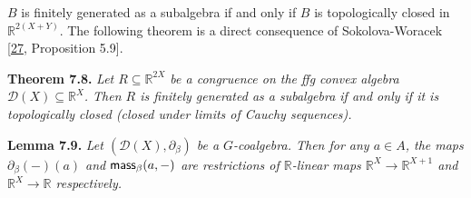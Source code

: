 \hypertarget{html:S7.SS0.SSS0.P0.SPx4.p2.m10}{}\({B}\) is finitely generated as a subalgebra if and only if %
\hypertarget{html:S7.SS0.SSS0.P0.SPx4.p2.m11}{}\({B}\) is topologically closed in %
\hypertarget{html:S7.SS0.SSS0.P0.SPx4.p2.m12}{}\({\mathbb{R}^{2(X+Y)}}\). The following theorem is a direct consequence of Sokolova-Woracek [\hyperlink{html:bib.bib27}{27}, Proposition 5.9].
\par\medskip
\hypertarget{html:S7.Thmtheorem8}{} \par\noindent\textbf{\textbf{Theorem 7.8}\textbf{.}}\quad  %
\hypertarget{html:S7.Thmtheorem8.p1}{} \emph{Let %
\hypertarget{html:S7.Thmtheorem8.p1.m1}{}\({R\subseteq\mathbb{R}^{2X}}\) be a congruence on the ffg convex algebra %
\hypertarget{html:S7.Thmtheorem8.p1.m2}{}\({{\mathcal{D}}(X)\subseteq\mathbb{R}^{X}}\). Then %
\hypertarget{html:S7.Thmtheorem8.p1.m3}{}\({R}\) is finitely generated as a subalgebra if and only if it is topologically closed (closed under limits of Cauchy sequences).}
\par\medskip
\hypertarget{html:S7.Thmtheorem9}{} \par\noindent\textbf{\textbf{Lemma 7.9}\textbf{.}}\quad  %
\hypertarget{html:S7.Thmtheorem9.p1}{} \emph{Let %
\hypertarget{html:S7.Thmtheorem9.p1.m1}{}\({({\mathcal{D}}(X),\partial_{\beta})}\) be a %
\hypertarget{html:S7.Thmtheorem9.p1.m2}{}\({G}\)-coalgebra. Then for any %
\hypertarget{html:S7.Thmtheorem9.p1.m3}{}\({a\in A}\), the maps %
\hypertarget{html:S7.Thmtheorem9.p1.m4}{}\({\partial_{\beta}(-)(a)}\) and %
\hypertarget{html:S7.Thmtheorem9.p1.m5}{}\({\mbox{\sf mass}_{\beta}(a,-)}\) are restrictions of %
\hypertarget{html:S7.Thmtheorem9.p1.m6}{}\({\mathbb{R}}\)-linear maps %
\hypertarget{html:S7.Thmtheorem9.p1.m7}{}\({\mathbb{R}^{X}\to\mathbb{R}^{X+1}}\) and %
\hypertarget{html:S7.Thmtheorem9.p1.m8}{}\({\mathbb{R}^{X}\to\mathbb{R}}\) respectively.}
\par\medskip
